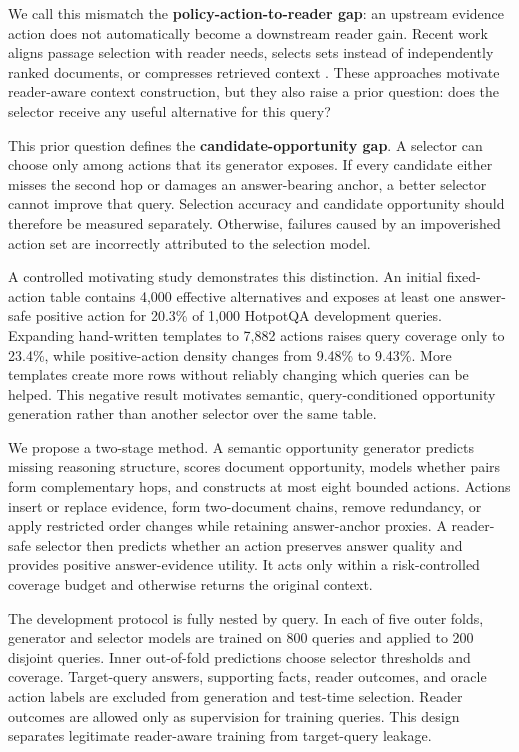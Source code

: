\documentclass[10pt,twocolumn]{article}
\begin{document}
We call this mismatch the \textbf{policy-action-to-reader gap}: an upstream evidence action does not automatically become a downstream reader gain. Recent work aligns passage selection with reader needs, selects sets instead of independently ranked documents, or compresses retrieved context \citep{xin-etal-2025-rcps,lee-etal-2025-setr,xu-etal-2024-recomp}. These approaches motivate reader-aware context construction, but they also raise a prior question: does the selector receive any useful alternative for this query?

This prior question defines the \textbf{candidate-opportunity gap}. A selector can choose only among actions that its generator exposes. If every candidate either misses the second hop or damages an answer-bearing anchor, a better selector cannot improve that query. Selection accuracy and candidate opportunity should therefore be measured separately. Otherwise, failures caused by an impoverished action set are incorrectly attributed to the selection model.

A controlled motivating study demonstrates this distinction. An initial fixed-action table contains 4,000 effective alternatives and exposes at least one answer-safe positive action for 20.3\% of 1,000 HotpotQA development queries. Expanding hand-written templates to 7,882 actions raises query coverage only to 23.4\%, while positive-action density changes from 9.48\% to 9.43\%. More templates create more rows without reliably changing which queries can be helped. This negative result motivates semantic, query-conditioned opportunity generation rather than another selector over the same table.

We propose a two-stage method. A semantic opportunity generator predicts missing reasoning structure, scores document opportunity, models whether pairs form complementary hops, and constructs at most eight bounded actions. Actions insert or replace evidence, form two-document chains, remove redundancy, or apply restricted order changes while retaining answer-anchor proxies. A reader-safe selector then predicts whether an action preserves answer quality and provides positive answer-evidence utility. It acts only within a risk-controlled coverage budget and otherwise returns the original context.

The development protocol is fully nested by query. In each of five outer folds, generator and selector models are trained on 800 queries and applied to 200 disjoint queries. Inner out-of-fold predictions choose selector thresholds and coverage. Target-query answers, supporting facts, reader outcomes, and oracle action labels are excluded from generation and test-time selection. Reader outcomes are allowed only as supervision for training queries. This design separates legitimate reader-aware training from target-query leakage.
\end{document}
